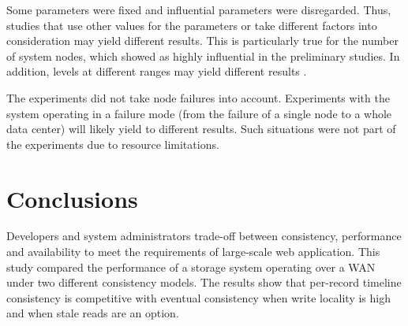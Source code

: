 \documentclass[doublespacing]{bmcart}
\begin{document}
Some parameters were fixed and influential parameters were disregarded. Thus,
studies that use other values for the parameters or take different factors into
consideration may yield different results. This is particularly true for the
number of system nodes, which showed as highly influential in the preliminary
studies. In addition, levels at different ranges may yield different results
\cite{Jain1991}.

The experiments did not take node failures into account. Experiments with the
system operating in a failure mode (from the failure of a single node to a
whole data center) will likely yield to different results. Such situations were
not part of the experiments due to resource limitations.

\section{Conclusions}

Developers and system administrators trade-off between consistency, performance
and availability to meet the requirements of large-scale web application. This
study compared the performance of a storage system operating over a WAN under
two different consistency models. The results show that per-record timeline
consistency is competitive with eventual consistency when write locality is
high and when stale reads are an option.

\end{document}
